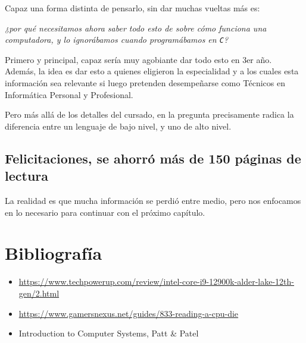 \documentclass[a4paper, titlepage]{report}
\begin{document}
	Capaz una forma distinta de pensarlo, sin dar muchas vueltas más es:
	
	\begin{center}
		\textit{¿por qué necesitamos ahora saber todo esto de sobre cómo funciona una computadora, y lo ignorábamos cuando programábamos en \texttt{C}?}
	\end{center}
	
	Primero y principal, capaz sería muy agobiante dar todo esto en 3er año. Además, la idea es dar esto a quienes eligieron la especialidad y a los cuales esta información sea relevante si luego pretenden desempeñarse como Técnicos en Informática Personal y Profesional.
	
	Pero más allá de los detalles del cursado, en la pregunta precisamente radica la diferencia entre un lenguaje de bajo nivel, y uno de alto nivel.
	
	\section{Felicitaciones, se ahorró más de 150 páginas de lectura}

	La realidad es que mucha información se perdió entre medio, pero nos enfocamos en lo necesario para continuar con el próximo capítulo.
	
	\chapter{Bibliografía} %
	
	\begin{itemize}
		\item \url{https://www.techpowerup.com/review/intel-core-i9-12900k-alder-lake-12th-gen/2.html}
		\item \url{https://www.gamersnexus.net/guides/833-reading-a-cpu-die}
		\item Introduction to Computer Systems, Patt \& Patel %
	\end{itemize}
	
\end{document}
